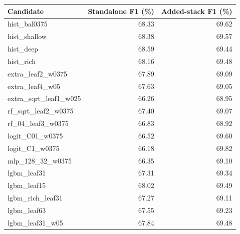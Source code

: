 \begin{tabular}{lrr}
\toprule
Candidate & Standalone F1 (\%) & Added-stack F1 (\%) \\
\midrule
hist\_bal0375 & 68.33 & 69.62 \\
hist\_shallow & 68.38 & 69.57 \\
hist\_deep & 68.59 & 69.44 \\
hist\_rich & 68.16 & 69.48 \\
extra\_leaf2\_w0375 & 67.89 & 69.09 \\
extra\_leaf4\_w05 & 67.63 & 69.05 \\
extra\_sqrt\_leaf1\_w025 & 66.26 & 68.95 \\
rf\_sqrt\_leaf2\_w0375 & 67.40 & 69.07 \\
rf\_04\_leaf3\_w0375 & 66.83 & 68.92 \\
logit\_C01\_w0375 & 66.52 & 69.60 \\
logit\_C1\_w0375 & 66.18 & 69.82 \\
mlp\_128\_32\_w0375 & 66.35 & 69.10 \\
lgbm\_leaf31 & 67.31 & 69.34 \\
lgbm\_leaf15 & 68.02 & 69.49 \\
lgbm\_rich\_leaf31 & 67.27 & 69.11 \\
lgbm\_leaf63 & 67.55 & 69.23 \\
lgbm\_leaf31\_w05 & 67.84 & 69.48 \\
\bottomrule
\end{tabular}

